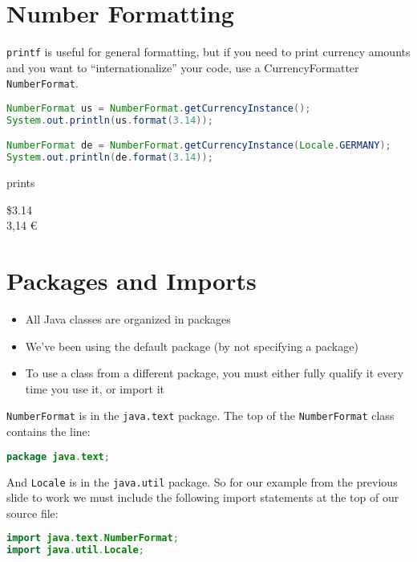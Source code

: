 \documentclass{article}
\begin{document}
\newpage

\section{Number Formatting}


{\tt printf} is useful for general formatting, but if you need to print currency amounts and you want to ``internationalize'' your code, use a CurrencyFormatter {\tt NumberFormat}.

\begin{lstlisting}[language=Java]
NumberFormat us = NumberFormat.getCurrencyInstance();
System.out.println(us.format(3.14));

NumberFormat de = NumberFormat.getCurrencyInstance(Locale.GERMANY);
System.out.println(de.format(3.14));
\end{lstlisting}
prints\\
\begin{framed}
\$3.14\\
3,14 \euro
\end{framed}


\section{Packages and Imports}

\begin{itemize}
\item All Java classes are organized in packages
\item We've been using the default package (by not specifying a package)
\item To use a class from a different package, you must either fully qualify it every time you use it, or import it
\end{itemize}

{\tt NumberFormat} is in the {\tt java.text} package.  The top of the {\tt NumberFormat} class contains the line:

\begin{lstlisting}[language=Java]
package java.text;
\end{lstlisting}

And {\tt Locale} is in the {\tt java.util} package.  So for our example from the previous slide to work we must include the following import statements at the top of our source file:

\begin{lstlisting}[language=Java]
import java.text.NumberFormat;
import java.util.Locale;
\end{lstlisting}
\end{document}
